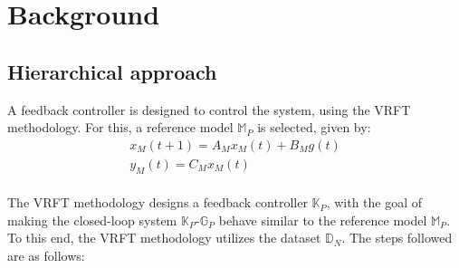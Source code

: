 \documentclass[letterpaper, 10 pt, conference]{ieeeconf}  %
\begin{document}
\section{Background}
\label{Background}
\subsection{Hierarchical approach}
A feedback controller is designed to control the system, using the VRFT methodology. For this, a reference model $\mathbb{M}_P$ is selected, given by:
	\begin{equation*}
	\begin{matrix}
	x_M(t+1) = A_Mx_M(t) + B_Mg(t)\\
	y_M(t) = C_Mx_M(t)
	\end{matrix}
	\end{equation*}\\  
 The VRFT methodology designs a feedback controller  $\mathbb{K}_P$, with the goal of making the closed-loop system $\mathbb{K}_P$-$\mathbb{G}_P$ behave similar to the reference model $\mathbb{M}_P$. To this end, the VRFT methodology utilizes the dataset $\mathbb{D}_N$. The steps followed are as follows:
\end{document}
